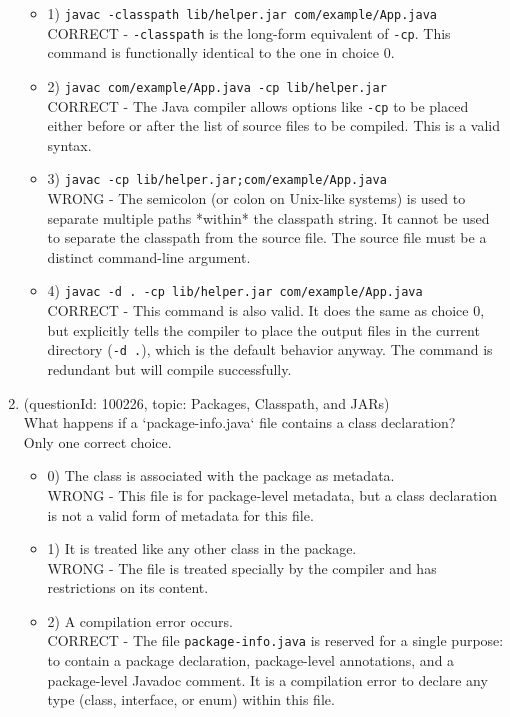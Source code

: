 \documentclass[12pt]{article}
\begin{document}
\begin{enumerate}[label=(\arabic*)]
\begin{itemize}
\item 1) \verb|javac -classpath lib/helper.jar com/example/App.java|
 \\ 
CORRECT - \verb|-classpath| is the long-form equivalent of \verb|-cp|. This command is functionally identical to the one in choice 0.

\item 2) \verb|javac com/example/App.java -cp lib/helper.jar|
 \\ 
CORRECT - The Java compiler allows options like \verb|-cp| to be placed either before or after the list of source files to be compiled. This is a valid syntax.

\item 3) \verb|javac -cp lib/helper.jar;com/example/App.java|
 \\ 
WRONG - The semicolon (or colon on Unix-like systems) is used to separate multiple paths *within* the classpath string. It cannot be used to separate the classpath from the source file. The source file must be a distinct command-line argument.

\item 4) \verb|javac -d . -cp lib/helper.jar com/example/App.java|
 \\ 
CORRECT - This command is also valid. It does the same as choice 0, but explicitly tells the compiler to place the output files in the current directory (\verb|-d .|), which is the default behavior anyway. The command is redundant but will compile successfully.

\end{itemize}
\item (questionId: 100226, topic: Packages, Classpath, and JARs) \\ 
What happens if a `package-info.java` file contains a class declaration?
\\ \noindent Only one correct choice. 
\begin{itemize}
\item 0) The class is associated with the package as metadata.
 \\ 
WRONG - This file is for package-level metadata, but a class declaration is not a valid form of metadata for this file.

\item 1) It is treated like any other class in the package.
 \\ 
WRONG - The file is treated specially by the compiler and has restrictions on its content.

\item 2) A compilation error occurs.
 \\ 
CORRECT - The file \verb|package-info.java| is reserved for a single purpose: to contain a package declaration, package-level annotations, and a package-level Javadoc comment. It is a compilation error to declare any type (class, interface, or enum) within this file.


\end{itemize}
\end{enumerate}
\end{document}
